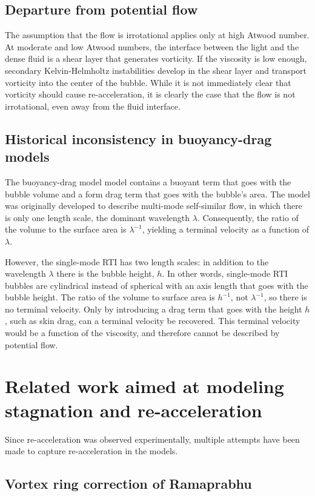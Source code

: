 \subsection{Departure from potential flow}
The assumption that the flow is irrotational applies only at high Atwood number.
At moderate and low Atwood numbers, the interface between the light and the dense fluid is a shear layer that generates vorticity.
If the viscosity is low enough, secondary Kelvin-Helmholtz instabilities develop in the shear layer and transport vorticity into the center of the bubble.
While it is not immediately clear that vorticity should cause re-acceleration, it is clearly the case that the flow is not irrotational, even away from the fluid interface.

\subsection{Historical inconsistency in buoyancy-drag models}

The buoyancy-drag model model contains a buoyant term that goes with the bubble volume and a form drag term that goes with the bubble's area.
The model was originally developed to describe multi-mode self-similar flow, in which there is only one length scale, the dominant wavelength $\lambda$.
Consequently, the ratio of the volume to the surface area is $\lambda^{-1}$, yielding a terminal velocity as a function of $\lambda$.

However, the single-mode RTI has two length scales: in addition to the wavelength $\lambda$ there is the bubble height, $h$.
In other words, single-mode RTI bubbles are cylindrical instead of spherical with an axis length that goes with the bubble height.
The ratio of the volume to surface area is $h^{-1}$, not $\lambda^{-1}$, so there is no terminal velocity.
Only by introducing a drag term that goes with the height $h$, such as skin drag, can a terminal velocity be recovered.
This terminal velocity would be a function of the viscosity, and therefore cannot be described by potential flow.

\section{Related work aimed at modeling stagnation and re-acceleration}
Since re-acceleration was observed experimentally, multiple attempts have been made to capture re-acceleration in the models.

\subsection{Vortex ring correction of Ramaprabhu}

